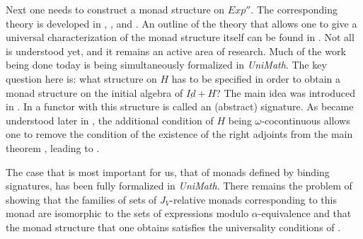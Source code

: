\documentclass[12pt]{amsart}
\renewcommand{\comment}[1]{}
\newcommand{\uu}{\underline}
\begin{document}
Next one needs to construct a monad structure on $Exp''$. The corresponding
theory is developed in \cite{MatthesUustalu}, \cite{AM2016}, and
\cite{AMM2016}. An outline of the theory that allows one to give a universal
characterization of the monad structure itself can be found in
\cite{HM2012}. Not all is understood yet, and it remains an active area of
research. Much of the work being done today is being simultaneously
formalized in {\em UniMath}. The key question here is: what structure on $H$ has
to be specified in order to obtain a monad structure on the initial algebra of
$\uu{Id}+H$?  The main idea was introduced in \cite{MatthesUustalu}. In
\cite{AM2016} a functor with this structure is called an (abstract)
signature. As became understood later in \cite{AMM2016}, the additional
condition of $H$ being $\omega$-cocontinuous allows one to remove the condition
of the existence of the right adjoints from the main theorem \cite[Th. 15,
  p.~170]{MatthesUustalu}, leading to \cite[Th. 48]{AMM2016}.

The case that is most important for us, that of monads defined by
binding signatures, has been fully formalized in {\em UniMath}. There remains the
problem of showing that the families of sets of $J_V$-relative monads
corresponding to this monad are isomorphic to the sets of expressions modulo
$\alpha$-equivalence and that the monad structure that one obtains
satisfies the universality conditions of \cite{HM2012}.

\comment{As was envisioned in \cite{FPT}, the isomorphisms, for $X\subset V$,
  between the sets $Exp''(X)$ and the corresponding sets of expressions modulo
  $\alpha$-equivalence depend on the choice of the binary coproduct
  structure on $Sets(U)$. Choosing the usual inclusions of $X$ and $Y$ into
  $X\coprod Y$ as the structural ones leads to one set of isomorphisms while
  choosing the inclusions composed with the permutation of $X$ and $Y$ as the
  structural ones to another. The first set, for $X=stn(n)$, corresponds to the
  description of the $\alpha$-equivalence classes using De Bruijn {\em levels}
  (numbered from $0$) while the second one corresponds to the description using
  De Bruijn {\em indices} (also numbered from $0$). For the details see
  \cite{FPT} and \cite{deBruijn72}. It is quite beautiful how two approaches to
  choosing canonical representatives in the $\alpha$-equivalence classes, which
  have long been known and used in the practice of programming, correspond to
  two different choices of the binary coproduct structure on the category of
  sets!
}
\end{document}

